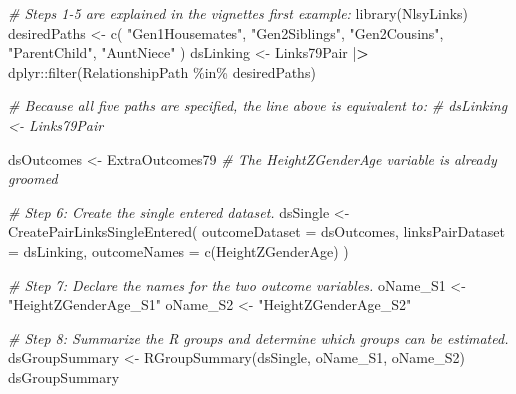 \documentclass[smallextended]{svjour3}       %
\newenvironment{Shaded}{\begin{snugshade}}{\end{snugshade}}
\newcommand{\AttributeTok}[1]{\textcolor[rgb]{0.77,0.63,0.00}{#1}}
\newcommand{\CommentTok}[1]{\textcolor[rgb]{0.56,0.35,0.01}{\textit{#1}}}
\newcommand{\ErrorTok}[1]{\textcolor[rgb]{0.64,0.00,0.00}{\textbf{#1}}}
\newcommand{\FunctionTok}[1]{\textcolor[rgb]{0.00,0.00,0.00}{#1}}
\newcommand{\NormalTok}[1]{#1}
\newcommand{\OtherTok}[1]{\textcolor[rgb]{0.56,0.35,0.01}{#1}}
\newcommand{\SpecialCharTok}[1]{\textcolor[rgb]{0.00,0.00,0.00}{#1}}
\newcommand{\StringTok}[1]{\textcolor[rgb]{0.31,0.60,0.02}{#1}}
\begin{document}
\begin{Shaded}
\begin{Highlighting}[]
\CommentTok{\# Steps 1{-}5 are explained in the vignette\textquotesingle{}s first example:}
\FunctionTok{library}\NormalTok{(NlsyLinks)}
\NormalTok{desiredPaths }\OtherTok{\textless{}{-}} 
  \FunctionTok{c}\NormalTok{(}
    \StringTok{"Gen1Housemates"}\NormalTok{, }
    \StringTok{"Gen2Siblings"}\NormalTok{, }\StringTok{"Gen2Cousins"}\NormalTok{,}
    \StringTok{"ParentChild"}\NormalTok{, }\StringTok{"AuntNiece"}
\NormalTok{  )}
\NormalTok{dsLinking }\OtherTok{\textless{}{-}} 
\NormalTok{  Links79Pair }\SpecialCharTok{|}\ErrorTok{\textgreater{}} 
\NormalTok{  dplyr}\SpecialCharTok{::}\FunctionTok{filter}\NormalTok{(RelationshipPath }\SpecialCharTok{\%in\%}\NormalTok{ desiredPaths)}

\CommentTok{\# Because all five paths are specified, the line above is equivalent to:}
\CommentTok{\# dsLinking \textless{}{-} Links79Pair}

\NormalTok{dsOutcomes }\OtherTok{\textless{}{-}}\NormalTok{ ExtraOutcomes79}
\CommentTok{\# The HeightZGenderAge variable is already groomed}

\CommentTok{\# Step 6: Create the single entered dataset.}
\NormalTok{dsSingle }\OtherTok{\textless{}{-}} 
  \FunctionTok{CreatePairLinksSingleEntered}\NormalTok{(}
    \AttributeTok{outcomeDataset   =}\NormalTok{ dsOutcomes,}
    \AttributeTok{linksPairDataset =}\NormalTok{ dsLinking,}
    \AttributeTok{outcomeNames     =} \FunctionTok{c}\NormalTok{(}\StringTok{\textquotesingle{}HeightZGenderAge\textquotesingle{}}\NormalTok{)}
\NormalTok{  )}

\CommentTok{\# Step 7: Declare the names for the two outcome variables.}
\NormalTok{oName\_S1 }\OtherTok{\textless{}{-}} \StringTok{"HeightZGenderAge\_S1"}
\NormalTok{oName\_S2 }\OtherTok{\textless{}{-}} \StringTok{"HeightZGenderAge\_S2"}

\CommentTok{\# Step 8: Summarize the R groups and determine which groups can be estimated.}
\NormalTok{dsGroupSummary }\OtherTok{\textless{}{-}} \FunctionTok{RGroupSummary}\NormalTok{(dsSingle, oName\_S1, oName\_S2)}
\NormalTok{dsGroupSummary}
\end{Highlighting}
\end{Shaded}
\end{document}
